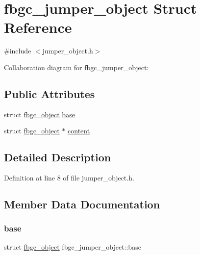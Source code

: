 \hypertarget{structfbgc__jumper__object}{}\section{fbgc\+\_\+jumper\+\_\+object Struct Reference}
\label{structfbgc__jumper__object}


{\ttfamily \#include $<$jumper\+\_\+object.\+h$>$}



Collaboration diagram for fbgc\+\_\+jumper\+\_\+object\+:
\subsection*{Public Attributes}
\begin{DoxyCompactItemize}
\item 
struct \hyperlink{structfbgc__object}{fbgc\+\_\+object} \hyperlink{structfbgc__jumper__object_acdb36be32c04d682f23b5843f6fedb85}{base}
\item 
struct \hyperlink{structfbgc__object}{fbgc\+\_\+object} $\ast$ \hyperlink{structfbgc__jumper__object_a555a64a0eb002d9e28e0fd9a0d7dcda8}{content}
\end{DoxyCompactItemize}


\subsection{Detailed Description}


Definition at line 8 of file jumper\+\_\+object.\+h.



\subsection{Member Data Documentation}
\mbox{\label{structfbgc__jumper__object_acdb36be32c04d682f23b5843f6fedb85}} 
\subsubsection{\texorpdfstring{base}{base}}
{\footnotesize\ttfamily struct \hyperlink{structfbgc__object}{fbgc\+\_\+object} fbgc\+\_\+jumper\+\_\+object\+::base}



